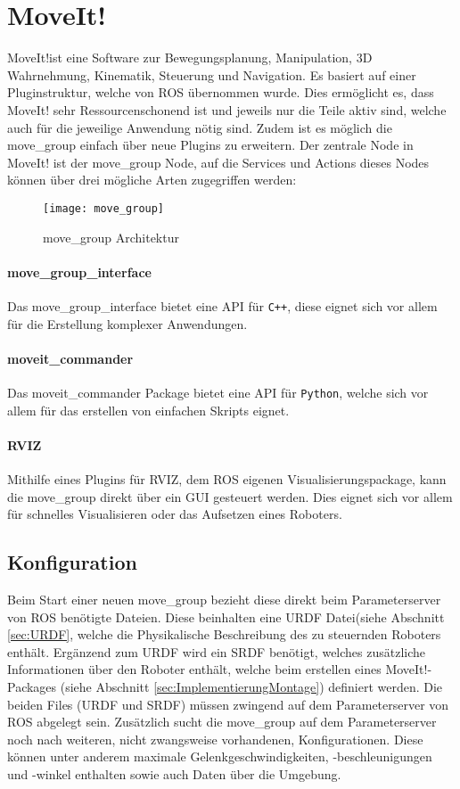 \section{MoveIt!}
MoveIt!ist eine Software zur Bewegungsplanung, Manipulation, 3D Wahrnehmung, Kinematik, Steuerung und Navigation. Es basiert auf einer Pluginstruktur, welche von ROS übernommen wurde. Dies ermöglicht es, dass MoveIt! sehr Ressourcenschonend ist und jeweils nur die Teile aktiv sind, welche auch für die jeweilige Anwendung nötig sind. Zudem ist es möglich die move\_group einfach über neue Plugins zu erweitern. Der zentrale Node in MoveIt! ist der move\_group Node, auf die Services und Actions dieses Nodes können über drei mögliche Arten zugegriffen werden:\cite{Chitta2016}

\begin{figure}[h!]
	\centering
	\texttt{[image: move\_group]}
	\caption[move\_group Architektur]{move\_group Architektur\cite{Concepts23:online}}
	\label{fig:move_group}
\end{figure}

\paragraph{move\_group\_interface}
Das move\_group\_interface bietet eine API für \verb|C++|, diese eignet sich vor allem für die Erstellung komplexer Anwendungen. 
\paragraph{moveit\_commander}
Das moveit\_commander Package bietet eine API für \verb|Python|, welche sich vor allem für das erstellen von einfachen Skripts eignet. 
\paragraph{RVIZ}
Mithilfe eines Plugins für RVIZ, dem ROS eigenen Visualisierungspackage, kann die move\_group direkt über ein \gls{GUI} gesteuert werden. Dies eignet sich vor allem für schnelles Visualisieren oder das Aufsetzen eines Roboters. 

\subsection{Konfiguration}
Beim Start einer neuen move\_group bezieht diese direkt beim Parameterserver von ROS benötigte Dateien. Diese beinhalten eine URDF Datei(siehe Abschnitt \ref{sec:URDF}, welche die Physikalische Beschreibung des zu steuernden Roboters enthält. Ergänzend zum URDF wird ein SRDF benötigt, welches zusätzliche Informationen über den Roboter enthält, welche beim erstellen eines MoveIt!-Packages (siehe Abschnitt \ref{sec:ImplementierungMontage}) definiert werden. Die beiden Files (URDF und SRDF) müssen zwingend auf dem Parameterserver von ROS abgelegt sein. Zusätzlich sucht die move\_group auf dem Parameterserver noch nach weiteren, nicht zwangsweise vorhandenen, Konfigurationen. Diese können unter anderem maximale Gelenkgeschwindigkeiten, -beschleunigungen und -winkel enthalten sowie auch Daten über die Umgebung. \cite{Concepts23:online}

